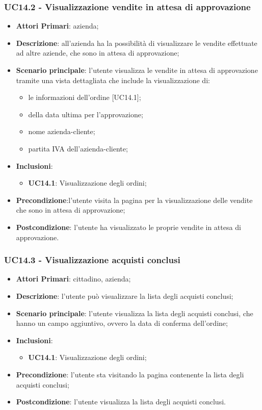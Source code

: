 \subsubsection{UC14.2 - Visualizzazione vendite in attesa di approvazione}
\begin{itemize}
	\item \textbf{Attori Primari}: azienda;
	\item \textbf{Descrizione}: all'azienda ha la possibilità di visualizzare le vendite effettuate ad altre aziende, che sono in attesa di approvazione;
	\item \textbf{Scenario principale}: l'utente visualizza le vendite in attesa di approvazione tramite una vista dettagliata che include la visualizzazione di: 
		\begin{itemize}
		\item le informazioni dell'ordine [UC14.1];
		\item della data ultima per l'approvazione;
		\item nome azienda-cliente;
		\item partita IVA dell'azienda-cliente;
		\end{itemize}
		\item \textbf{Inclusioni}:
	\begin{itemize}
		\item \textbf{UC14.1}: Visualizzazione degli ordini;
	\end{itemize}
	\item \textbf{Precondizione}:l'utente visita la pagina per la visualizzazione delle vendite che sono in attesa di approvazione;
	\item \textbf{Postcondizione}: l'utente ha visualizzato le proprie vendite in attesa di approvazione.
\end{itemize} 

\subsubsection{UC14.3 - Visualizzazione acquisti conclusi}
\begin{itemize}
	\item \textbf{Attori Primari}: cittadino, azienda;
	\item \textbf{Descrizione}: l'utente può visualizzare la lista degli acquisti conclusi;
	\item \textbf{Scenario principale}: l'utente visualizza la lista degli acquisti conclusi, che hanno un campo aggiuntivo, ovvero la data di conferma dell'ordine;
	\item \textbf{Inclusioni}:
	\begin{itemize}
		\item \textbf{UC14.1}: Visualizzazione degli ordini;
	\end{itemize}
	\item \textbf{Precondizione}: l'utente sta visitando la pagina contenente la lista degli acquisti conclusi;
	\item \textbf{Postcondizione}: l'utente visualizza la lista degli acquisti conclusi.
\end{itemize}

